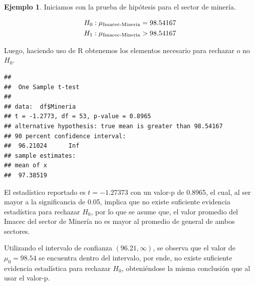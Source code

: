 \documentclass[
]{book}
\newenvironment{Shaded}{\begin{snugshade}}{\end{snugshade}}
\newcommand{\AttributeTok}[1]{\textcolor[rgb]{0.77,0.63,0.00}{#1}}
\newcommand{\CommentTok}[1]{\textcolor[rgb]{0.56,0.35,0.01}{\textit{#1}}}
\newcommand{\FloatTok}[1]{\textcolor[rgb]{0.00,0.00,0.81}{#1}}
\newcommand{\FunctionTok}[1]{\textcolor[rgb]{0.00,0.00,0.00}{#1}}
\newcommand{\NormalTok}[1]{#1}
\newcommand{\SpecialCharTok}[1]{\textcolor[rgb]{0.00,0.00,0.00}{#1}}
\newcommand{\StringTok}[1]{\textcolor[rgb]{0.31,0.60,0.02}{#1}}
\theoremstyle{definition}
\theoremstyle{definition}
\newtheorem{example}{Ejemplo}[chapter]
\theoremstyle{definition}
\theoremstyle{definition}
\theoremstyle{remark}
\begin{document}
\begin{example}
Iniciamos con la prueba de hipótesis para el sector de minería.

\begin{equation}
    \notag
    \begin{split}
        H_0: \mu_{\text{Imacec-Mineria}} = 98.54167\\
        H_1: \mu_{\text{Imacec-Mineria}} > 98.54167
    \end{split}
\end{equation}

Luego, haciendo uso de R obtenemos los elementos necesario para rechazar o no \(H_0\).

\begin{Shaded}
\end{Shaded}

\begin{verbatim}
## 
##  One Sample t-test
## 
## data:  df$Mineria
## t = -1.2773, df = 53, p-value = 0.8965
## alternative hypothesis: true mean is greater than 98.54167
## 90 percent confidence interval:
##  96.21024      Inf
## sample estimates:
## mean of x 
##  97.38519
\end{verbatim}

El estadístico reportado es \(t = -1.27373\) con un valor-p de 0.8965, el cual, al ser mayor a la significancia de 0.05, implica que no existe suficiente evidencia estadística para rechazar \(H_0\), por lo que se asume que, el valor promedio del Imacec del sector de Minería no es mayor al promedio de general de ambos sectores.

Utilizando el intervalo de confianza \((96.21, \infty)\), se observa que el valor de \(\mu_0 = 98.54\) se encuentra dentro del intervalo, por ende, no existe suficiente evidencia estadística para rechazar \(H_0\), obteniéndose la misma conclusión que al usar el valor-p.


\end{example}
\end{document}
